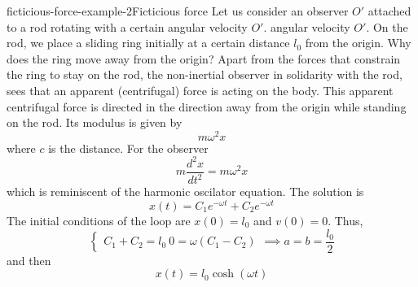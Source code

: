 \documentclass[preview]{standalone}
\begin{document}
\begin{snippetexample}{ficticious-force-example-2}{Ficticious force}
    Let us consider an observer \(O'\) attached to a rod rotating with a certain angular velocity \(O'\).
    angular velocity \(O'\). On the rod, we place a sliding ring initially at a certain distance
    \(l_0\) from the origin.
    Why does the ring move away from the origin?
    Apart from the forces that constrain the ring to stay on the rod, the non-inertial observer
    in solidarity with the rod, sees that an apparent (centrifugal) force is acting on the body.
    This apparent centrifugal force is directed in the direction away from the origin
    while standing on the rod. Its modulus is given by
    \[
        m\omega^2 x
    \]
    where \(c\) is the distance.
    For the observer
    \[
        m \frac{d^2x}{dt^2} = m\omega^2 x
    \]
    which is reminiscent of the harmonic oscilator equation. The solution is
    \[
        x(t) = C_1e^{-\omega t} + C_2e^{-\omega t}
    \]
    The initial conditions of the loop are \(x(0)=l_0\)
    and \(v(0) = 0\).
    Thus,
    \[
        \begin{cases}
            C_1 + C_2 = l_0 \
            0 = \omega(C_1 - C_2)
        \end{cases}
        \implies a = b = \frac{l_0}{2}
    \]
    and then
    \[
        x(t) = l_0 \cosh(\omega t)
    \]
\end{snippetexample}
\end{document}
